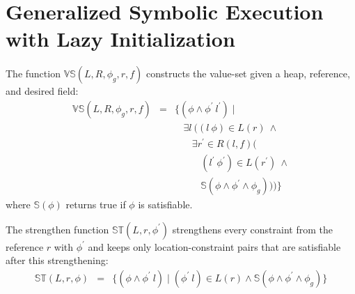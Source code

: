 \section{Generalized Symbolic Execution with Lazy Initialization}

The function $\mathbb{VS}(L,R,\phi_g,r,f)$ constructs the value-set given a
heap, reference, and desired field:
\[
\begin{array}{rcl}
  \mathbb{VS}(L,R,\phi_g,r,f) & = & \{(\phi\wedge\phi^\prime\ l^\prime) \mid \\
  & & \ \ \ \ \exists l\ ((l\ \phi) \in L(r)\ \wedge \\
  & & \ \ \ \ \ \ \ \ \exists r^\prime \in R(l,f) ( \\
  & & \ \ \ \ \ \ \ \ \ \ \ \ (l^\prime\ \phi^\prime) \in L(r^\prime)\ \wedge\\
  & & \ \ \ \ \ \ \ \ \ \ \ \ \mathbb{S}(\phi\wedge\phi^\prime\wedge \phi_g)))\}
\end{array}
\]
where $\mathbb{S}(\phi)$ returns true if $\phi$ is satisfiable.

The strengthen function $\mathbb{ST}(L,r,\phi^\prime)$ strengthens every
constraint from the reference $r$ with $\phi^\prime$ and keeps only location-constraint
pairs that are satisfiable after this strengthening:
\[
\begin{array}{rcl} 
\mathbb{ST}(L,r,\phi) & = & \{ (\phi\wedge\phi^\prime\ l) \mid 
(\phi^\prime\ l)\in L(r)\wedge\mathbb{S}(\phi\wedge\phi^\prime\wedge\phi_g) \}
\end{array}
\]




